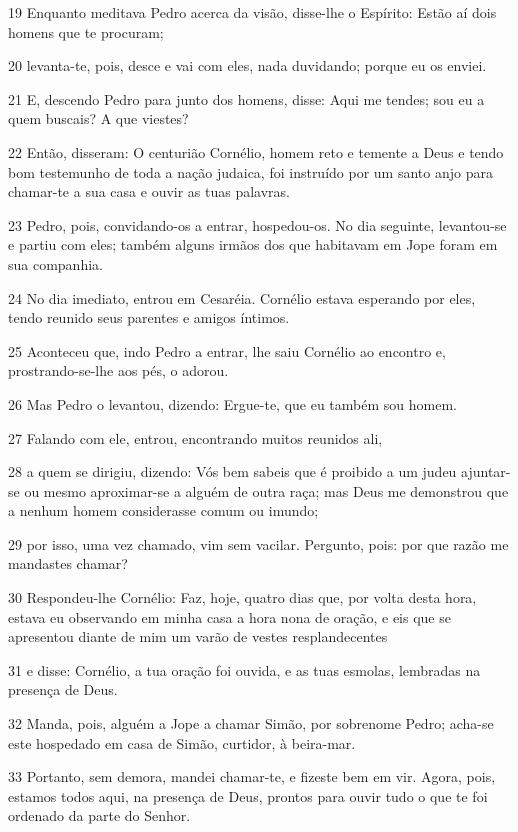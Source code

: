 \par 19 Enquanto meditava Pedro acerca da visão, disse-lhe o Espírito: Estão aí dois homens que te procuram;
\par 20 levanta-te, pois, desce e vai com eles, nada duvidando; porque eu os enviei.
\par 21 E, descendo Pedro para junto dos homens, disse: Aqui me tendes; sou eu a quem buscais? A que viestes?
\par 22 Então, disseram: O centurião Cornélio, homem reto e temente a Deus e tendo bom testemunho de toda a nação judaica, foi instruído por um santo anjo para chamar-te a sua casa e ouvir as tuas palavras.
\par 23 Pedro, pois, convidando-os a entrar, hospedou-os. No dia seguinte, levantou-se e partiu com eles; também alguns irmãos dos que habitavam em Jope foram em sua companhia.
\par 24 No dia imediato, entrou em Cesaréia. Cornélio estava esperando por eles, tendo reunido seus parentes e amigos íntimos.
\par 25 Aconteceu que, indo Pedro a entrar, lhe saiu Cornélio ao encontro e, prostrando-se-lhe aos pés, o adorou.
\par 26 Mas Pedro o levantou, dizendo: Ergue-te, que eu também sou homem.
\par 27 Falando com ele, entrou, encontrando muitos reunidos ali,
\par 28 a quem se dirigiu, dizendo: Vós bem sabeis que é proibido a um judeu ajuntar-se ou mesmo aproximar-se a alguém de outra raça; mas Deus me demonstrou que a nenhum homem considerasse comum ou imundo;
\par 29 por isso, uma vez chamado, vim sem vacilar. Pergunto, pois: por que razão me mandastes chamar?
\par 30 Respondeu-lhe Cornélio: Faz, hoje, quatro dias que, por volta desta hora, estava eu observando em minha casa a hora nona de oração, e eis que se apresentou diante de mim um varão de vestes resplandecentes
\par 31 e disse: Cornélio, a tua oração foi ouvida, e as tuas esmolas, lembradas na presença de Deus.
\par 32 Manda, pois, alguém a Jope a chamar Simão, por sobrenome Pedro; acha-se este hospedado em casa de Simão, curtidor, à beira-mar.
\par 33 Portanto, sem demora, mandei chamar-te, e fizeste bem em vir. Agora, pois, estamos todos aqui, na presença de Deus, prontos para ouvir tudo o que te foi ordenado da parte do Senhor.
